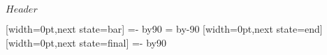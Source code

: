 \ProvidesPackageRCS[v\pgfversion] $Header$

%




%

{
  [width=0pt,next state=bar]
  {
    {
    \pgftransformxshift{-\pgfsnakecirclestartradius}%
    \pgfpathmoveto{\pgfpointpolar{\pgfsnakesegmentangle}{\pgfsnakecirclestartradius}}
    \pgfpatharc{\pgfsnakesegmentangle}{-\pgfsnakesegmentangle}{\pgfsnakecirclestartradius}
    \@tempcnta=-\pgfsnakesegmentangle\relax
    \advance\@tempcnta by90\relax
    \setlength\@tempdima{\pgfsnakecirclestartradius}
    \setlength\@tempdimb{\pgfsnakesegmentamplitude}
    \pgfpathcurveto
    {\pgfpointadd
      {\pgfpointpolar{-\pgfsnakesegmentangle}{\pgfsnakecirclestartradius}}
      {}}
    {}
    {}
    \@tempcnta=\pgfsnakesegmentangle\relax
    \advance\@tempcnta by-90\relax
    \pgfpathcurveto
    {}
    {\pgfpointadd
      {\pgfpointpolar{\pgfsnakesegmentangle}{\pgfsnakecirclestartradius}}
      {}}
    {\pgfpointpolar{\pgfsnakesegmentangle}{\pgfsnakecirclestartradius}}
    \pgfpathclose
    }
  }
  [width=0pt,next state=end]
  {
    \setlength\@tempdima{\pgfsnakecirclestartradius}%
    \setlength\@tempdimb{\pgfsnakecircleendradius}%
    \setlength\pgf@xc{\pgfsnakesegmentamplitude}%
    \pgfpathrectangle
    {}
    {}
  }
  [width=0pt,next state=final]
  {
    {
    \pgftransformxshift{\pgfsnakeremainingdistance}%
    \pgftransformxshift{-\pgfsnakecircleendradius}%
    \pgfpathmoveto{\pgfpointpolar{\pgfsnakesegmentangle}{\pgfsnakecircleendradius}}
    \pgfpatharc{\pgfsnakesegmentangle}{-\pgfsnakesegmentangle}{\pgfsnakecircleendradius}
    \@tempcnta=-\pgfsnakesegmentangle\relax
    \advance\@tempcnta by90\relax
    \setlength\@tempdima{\pgfsnakecircleendradius}
}}}

